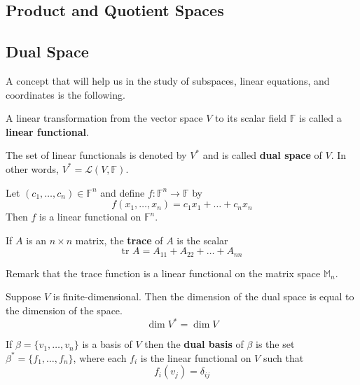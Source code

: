 \subsection{Product and Quotient Spaces}

\subsection{Dual Space}

A concept that will help us in the study of subspaces, linear equations, and coordinates is the following.

\begin{definition}
	A linear transformation from the vector space $V$ to its scalar field $\mathbb{F}$ is called a \textbf{linear functional}.
	
	The set of linear functionals is denoted by $V^\ast$ and is called \textbf{dual space} of $V$. In other words, $V^\ast = \mathcal{L}(V, \mathbb{F})$.
\end{definition}

\begin{example}
	Let $(c_1, \ldots, c_n) \in \mathbb{F}^n$ and define $f : \mathbb{F}^n \longrightarrow \mathbb{F}$ by 
	\[
		f(x_1, \ldots, x_n) = c_1 x_1 + \ldots + c_n x_n
	\]
	Then $f$ is a linear functional on $\mathbb{F}^n$.
\end{example}

\begin{example}[Trace]
	If $A$ is an $n \times n$ matrix, the \textbf{trace} of $A$ is the scalar
	\[
		\text{tr } A = A_{11} + A_{22} + \ldots + A_{nn}
	\]
	
	Remark that the trace function is a linear functional on the matrix space $\mathbb{M}_n$.
\end{example}

\begin{remark}
	Suppose $V$ is finite-dimensional. Then the dimension of the dual space is equal to the dimension of the space.
	\[
		\dim V^\ast = \dim V
	\]
\end{remark}

\begin{definition}
	If $\beta = \{ v_1, \ldots, v_n \}$ is a basis of $V$ then the \textbf{dual basis} of $\beta$ is the set $\beta^\ast = \{ f_1, \ldots, f_n \}$, where each $f_i$ is the linear functional on $V$ such that 
	\[
		f_i(v_j) = \delta_{ij}
	\]
\end{definition}


